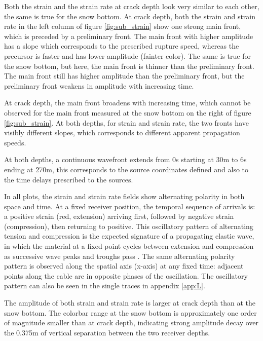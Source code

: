 Both the strain and the strain rate at crack depth look very similar to each other, the same is true for the snow bottom. At crack depth, both the strain and strain rate in the left column of figure \ref{fig:sub_strain} show one strong main front, which is preceded by a preliminary front. The main front with higher amplitude has a slope which corresponds to the prescribed rupture speed, whereas the precursor is faster and has lower amplitude (fainter color). The same is true for the snow bottom, but here, the main front is thinner than the preliminary front. The main front still has higher amplitude than the preliminary front, but the preliminary front weakens in amplitude with increasing time. \par

At crack depth, the main front broadens with increasing time, which cannot be observed for the main front measured at the snow bottom on the right of figure \ref{fig:sub_strain}. At both depths, for strain and strain rate, the two fronts have visibly different slopes, which corresponds to different apparent propagation speeds. \par

At both depths, a continuous wavefront extends from 0s starting at 30m to 6s ending at 270m, this corresponds to the source coordinates defined and also to the time delays prescribed to the sources. \par

In all plots, the strain and strain rate fields show alternating polarity in both space and time. At a fixed receiver position, the temporal sequence of arrivals is:  a positive strain (red, extension) arriving first, followed by negative strain (compression), then returning to positive. This oscillatory pattern of alternating tension and compression is the expected signature of a propagating elastic wave, in which the material at a fixed point cycles between extension and compression as successive wave peaks and troughs pass \parencite{kAkiRichards19801981}. The same alternating polarity pattern is observed along the spatial axis (x-axis) at any fixed time: adjacent points along the cable are in opposite phases of the oscillation. The oscillatory pattern can also be seen in the single traces in appendix \ref{app:L}.\par

The amplitude of both strain and strain rate is larger at crack depth than at the snow bottom. The colorbar range at the snow bottom is approximately one order of magnitude smaller than at crack depth, indicating strong amplitude decay over the 0.375m of vertical separation between the two receiver depths.\par

